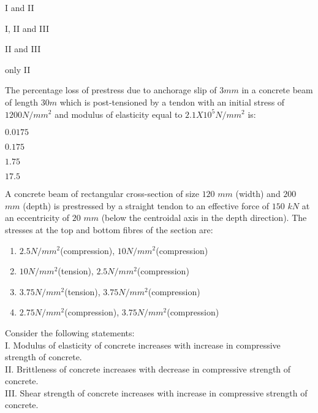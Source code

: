 	\begin{enumerate}
	\end{enumerate}
\item The percentage loss of prestress due to anchorage slip of $3mm$ in a concrete beam of length $30m$ which is post-tensioned by a tendon with an initial stress of $1200N/mm^2$ and modulus of elasticity equal to $2.1 X 10^5N/mm^2$ is: 
	\begin{enumerate}
			\begin{multicols}{4}
		\item $0.0175$
		\item $0.175$
		\item $1.75$
		\item $17.5$
			\end{multicols}
	\end{enumerate}
\item A concrete beam of rectangular cross-section of size $120$ $mm$ (width) and $200$ $mm$ (depth) is prestressed by a straight tendon to an effective force of $150$ $kN$ at an eccentricity of $20$ $mm$ (below the centroidal axis in the depth direction). The stresses at the top and bottom fibres of the section are:
	\begin{enumerate} 
			\item $2.5 N/mm^2$(compression), $10 N/mm^2$(compression)
			\item $10 N/mm^2$(tension), $2.5 N/mm^2$(compression)
			\item $3.75 N/mm^2$(tension), $3.75 N/mm^2$(compression)
			\item $2.75 N/mm^2$(compression), $3.75 N/mm^2$(compression)
			\end{enumerate}
\item Consider the following statements:\\
I. Modulus of elasticity of concrete increases with increase in compressive strength of concrete.\\
II. Brittleness of concrete increases with decrease in compressive strength of concrete.\\
III. Shear strength of concrete increases with increase in compressive strength of concrete.\\
